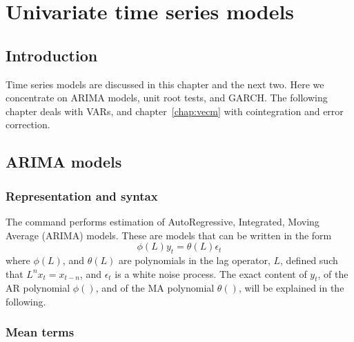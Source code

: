 \chapter{Univariate time series models}
\label{chap:timeseries}

\section{Introduction}
\label{sec:tsintro}

Time series models are discussed in this chapter and the next two.
Here we concentrate on ARIMA models, unit root tests, and GARCH. The
following chapter deals with VARs, and chapter~\ref{chap:vecm} with
cointegration and error correction.

\section{ARIMA models}
\label{arma-estimation}

\subsection{Representation and syntax}
\label{arma-repr}

The  command performs estimation of AutoRegressive,
Integrated, Moving Average (ARIMA) models.  These are models that can
be written in the form
\begin{equation}
  \label{eq:plain-0-arma}
  \phi(L) y_t = \theta(L) \epsilon_t
\end{equation}
where $\phi(L)$, and $\theta(L)$ are polynomials in the lag operator,
$L$, defined such that $L^n x_t = x_{t-n}$, and $\epsilon_t$ is a
white noise process. The exact content of $y_t$, of the AR polynomial
$\phi()$, and of the MA polynomial $\theta()$, will be explained in the
following.

\subsection{Mean terms}
\label{sec:arma-nonzeromean}


